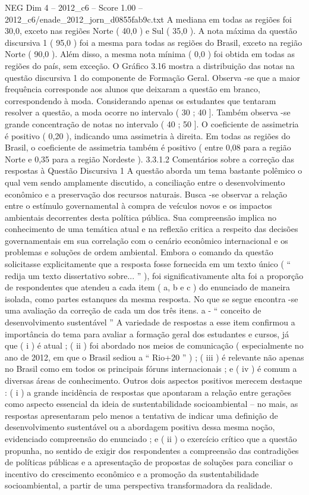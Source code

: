 \begin{textsample}{NEG Dim 4 – 2012\_c6 – Score 1.00 – 2012\_c6/enade\_2012\_jorn\_d0855fab9c.txt}
A mediana em todas as regiões foi 30,0, exceto nas regiões Norte ( 40,0 ) e Sul ( 35,0 ).
A nota máxima da questão discursiva 1 ( 95,0 ) foi a mesma para todas as regiões do Brasil, exceto na região Norte ( 90,0 ).
Além disso, a mesma nota mínima ( 0,0 ) foi obtida em todas as regiões do país, sem exceção.
O Gráfico 3.16 mostra a distribuição das notas na questão discursiva 1 do componente de Formação Geral.
Observa -se que a maior frequência corresponde aos alunos que deixaram a questão em branco, correspondendo à moda.
Considerando apenas os estudantes que tentaram resolver a questão, a moda ocorre no intervalo ( 30 ; 40 ].
Também observa -se grande concentração de notas no intervalo ( 40 ; 50 ].
O coeficiente de assimetria é positivo ( 0,20 ), indicando uma assimetria à direita.
Em todas as regiões do Brasil, o coeficiente de assimetria também é positivo ( entre 0,08 para a região Norte e 0,35 para a região Nordeste ). 3.3.1.2 Comentários sobre a correção das respostas à Questão Discursiva 1 A questão aborda um tema bastante polêmico o qual vem sendo amplamente discutido, a conciliação entre o desenvolvimento econômico e a preservação dos recursos naturais.
Busca -se observar a relação entre o estímulo governamental à compra de veículos novos e os impactos ambientais decorrentes desta política pública.
Sua compreensão implica no conhecimento de uma temática atual e na reflexão critica a respeito das decisões governamentais em sua correlação com o cenário econômico internacional e os problemas e soluções de ordem ambiental.
Embora o comando da questão solicitasse explicitamente que a resposta fosse fornecida em um texto único ( “ redija um texto dissertativo sobre... ” ), foi significativamente alta foi a proporção de respondentes que atendeu a cada item ( a, b e c ) do enunciado de maneira isolada, como partes estanques da mesma resposta.
No que se segue encontra -se uma avaliação da correção de cada um dos três itens. a - “ conceito de desenvolvimento sustentável ” A variedade de respostas a esse item confirmou a importância do tema para avaliar a formação geral dos estudantes e cursos, já que ( i ) é atual ; ( ii ) foi abordado nos meios de comunicação ( especialmente no ano de 2012, em que o Brasil sediou a “ Rio+20 ” ) ; ( iii ) é relevante não apenas no Brasil como em todos os principais fóruns internacionais ; e ( iv ) é comum a diversas áreas de conhecimento.
Outros dois aspectos positivos merecem destaque : ( i ) a grande incidência de respostas que apontaram a relação entre gerações como aspecto essencial da ideia de sustentabilidade socioambiental – no mais, as respostas apresentaram pelo menos a tentativa de indicar uma definição de desenvolvimento sustentável ou a abordagem positiva dessa mesma noção, evidenciado compreensão do enunciado ; e ( ii ) o exercício crítico que a questão propunha, no sentido de exigir dos respondentes a compreensão das contradições de políticas públicas e a apresentação de propostas de soluções para conciliar o incentivo do crescimento econômico e a promoção da sustentabilidade socioambiental, a partir de uma perspectiva transformadora da realidade.

\end{textsample}
